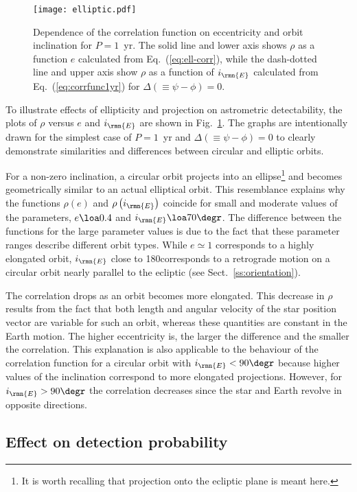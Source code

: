 \documentclass[fleqn,usenatbib,useAMS,usedcolumn]{mnras}
\begin{document}
\begin{figure}
  \centering
  \texttt{[image: elliptic.pdf]}
 \caption{Dependence of the correlation function on eccentricity and orbit inclination for $P=1$~yr. The solid line and lower axis shows $\rho$ as a function $e$ calculated from Eq.~(\ref{eq:ell-corr}), while the dash-dotted line and upper axis show $\rho$ as a function of $i_\rmn{E}$ calculated from Eq.~(\ref{eq:corrfunc1yr}) for $\Delta\left(\equiv\psi-\phi\right)=0$.}
  \label{fig:elliptic}
\end{figure}

To illustrate effects of ellipticity and projection on astrometric detectability, the plots of $\rho$ versus $e$ and $i_\rmn{E}$ are shown in Fig.~\ref{fig:elliptic}. The graphs are intentionally drawn for the simplest case of $P=1$~yr and $\Delta\left(\equiv\psi-\phi\right)=0$ to clearly demonstrate similarities and differences between circular and elliptic orbits.

For a non-zero inclination, a circular orbit projects into an ellipse\footnote{It is worth recalling that projection onto the ecliptic plane is meant here.} and becomes geometrically similar to an actual elliptical orbit. This resemblance explains why the functions $\rho\left(e\right)$ and $\rho\left(i_\rmn{E}\right)$ coincide for small and moderate values of the parameters, $e\loa0.4$ and $i_\rmn{E}\loa70\degr$. The difference between the functions for the large parameter values is due to the fact that these parameter ranges describe different orbit types. While $e\simeq1$ corresponds to a highly elongated orbit, $i_\rmn{E}$ close to 180\degr corresponds to a retrograde motion on a circular orbit nearly parallel to the ecliptic (see Sect.~\ref{ss:orientation}).

The correlation drops as an orbit becomes more elongated. This decrease in $\rho$ results from the fact that both length and angular velocity of the star position vector are variable for such an orbit, whereas these quantities are constant in the Earth motion. The higher eccentricity is, the larger the difference and the smaller the correlation. This explanation is also applicable to the behaviour of the correlation function for a circular orbit with $i_\rmn{E}<90\degr$ because higher values of the inclination correspond to more elongated projections. However, for $i_\rmn{E}>90\degr$ the correlation decreases since the star and Earth revolve in opposite directions.

\subsection{Effect on detection probability}
\end{document}
